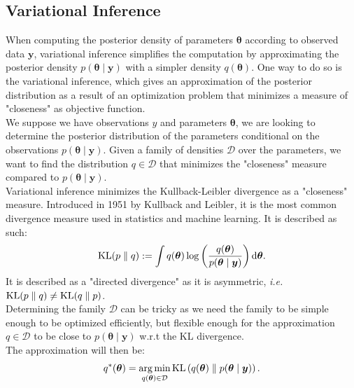 \documentclass{article}
\DeclareMathOperator*{\argmin}{arg\,min}
\DeclareMathOperator*{\KL}{{\rm KL}}
\begin{document}
\subsection{Variational Inference}
When computing the posterior density of parameters $\boldsymbol{\theta}$ according to observed data $\boldsymbol{y}$, variational inference simplifies the computation by approximating the posterior density $p(\boldsymbol{\theta}\mid \boldsymbol{y})$ with a simpler density $q(\boldsymbol{\theta})$. One way to do so is the variational inference, which gives an approximation of the posterior distribution as a result of an optimization problem that minimizes a measure of "closeness" as objective function.\\
\newline
%
We suppose we have observations $y$ and parameters $\boldsymbol{\theta}$, we are looking to determine the posterior distribution of the parameters conditional on the observations $p(\boldsymbol{\theta} \mid \boldsymbol{y})$. Given a family of densities $\mathcal{D}$ over the parameters, we want to find the distribution $q \in \mathcal{D}$ that minimizes the "closeness" measure compared to $p(\boldsymbol{\theta} \mid \boldsymbol{y})$.\\
\newline
%
Variational inference minimizes the Kullback-Leibler divergence as a "closeness" measure. Introduced in 1951 by Kullback and Leibler\cite{kl51}, it is the most common divergence measure used in statistics and machine learning. It is described as such:
\begin{equation*}
\KL(p\parallel q) := \int q(\boldsymbol{\theta})\log \left(\frac{q(\boldsymbol{\theta})}{p(\boldsymbol{\theta} \mid \boldsymbol{y})}\right) \mathrm{d}\boldsymbol{\theta}.
\end{equation*} 
It is described as a "directed divergence" as it is asymmetric, \textit{i.e.} $\KL(p\parallel q) \neq \KL(q \parallel p)$.\\
\newline
%
Determining the family $\mathcal{D}$ can be tricky as we need the family to be simple enough to be optimized efficiently, but flexible enough for the approximation $q \in \mathcal{D}$ to be close to $p(\boldsymbol{\theta} \mid \boldsymbol{y})$ w.r.t the KL divergence.\\
\newline
%
The approximation will then be:
\begin{equation*}
q^*(\boldsymbol{\theta} ) = \argmin_{q(\boldsymbol{\theta}) \in \mathcal{D}} \KL\left( q(\boldsymbol{\theta}) \parallel p(\boldsymbol{\theta} \mid \boldsymbol{y})\right).
\end{equation*}
\end{document}
